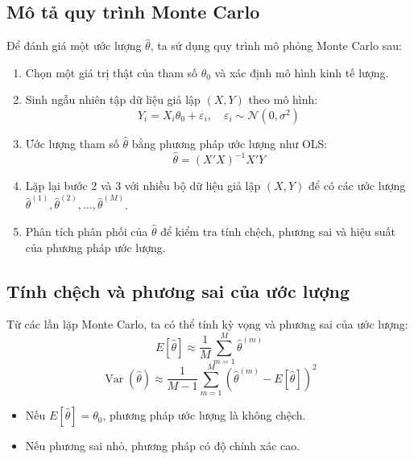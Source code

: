 \subsection{Mô tả quy trình Monte Carlo}
Để đánh giá một ước lượng $\hat{\theta}$, ta sử dụng quy trình mô phỏng Monte Carlo sau:
\begin{enumerate}
    \item Chọn một giá trị thật của tham số $\theta_0$ và xác định mô hình kinh tế lượng.
    \item Sinh ngẫu nhiên tập dữ liệu giả lập $(X, Y)$ theo mô hình:
    \begin{equation}
        Y_i = X_i \theta_0 + \varepsilon_i, \quad \varepsilon_i \sim \mathcal{N}(0, \sigma^2)
    \end{equation}
    \item Ước lượng tham số $\hat{\theta}$ bằng phương pháp ước lượng như OLS:
    \begin{equation}
        \hat{\theta} = (X'X)^{-1}X'Y
    \end{equation}
    \item Lặp lại bước 2 và 3 với nhiều bộ dữ liệu giả lập $(X, Y)$ để có các ước lượng $\hat{\theta}^{(1)}, \hat{\theta}^{(2)}, \dots, \hat{\theta}^{(M)}$.
    \item Phân tích phân phối của $\hat{\theta}$ để kiểm tra tính chệch, phương sai và hiệu suất của phương pháp ước lượng.
\end{enumerate}

\subsection{Tính chệch và phương sai của ước lượng}
Từ các lần lặp Monte Carlo, ta có thể tính kỳ vọng và phương sai của ước lượng:
\begin{equation}
    E[\hat{\theta}] \approx \frac{1}{M} \sum_{m=1}^{M} \hat{\theta}^{(m)}
\end{equation}
\begin{equation}
    \operatorname{Var}(\hat{\theta}) \approx \frac{1}{M - 1} \sum_{m=1}^{M} (\hat{\theta}^{(m)} - E[\hat{\theta}])^2
\end{equation}
\begin{itemize}
    \item Nếu $E[\hat{\theta}] = \theta_0$, phương pháp ước lượng là không chệch.
    \item Nếu phương sai nhỏ, phương pháp có độ chính xác cao.
\end{itemize}

